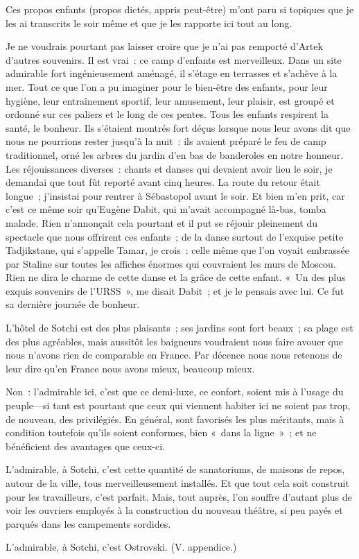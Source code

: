 \documentclass[french,twoside]{book} %
\newcommand{\astermono}{\medskip\centerline{\color{rubric}\large\selectfont{\syms ✻}}\medskip\par}%
\begin{document}
Ces propos enfants (propos dictés, appris peut-être) m’ont paru si topiques que je les ai transcrits le soir même et que je les rapporte ici tout au long.\par
Je ne voudrais pourtant pas laisser croire que je n’ai pas remporté d’Artek d’autres souvenirs. Il est vrai : ce camp d’enfants est merveilleux. Dans un site admirable fort ingénieusement aménagé, il s’étage en terrasses et s’achève à la mer. Tout ce que l’on a pu imaginer pour le bien-être des enfants, pour leur hygiène, leur entraînement sportif, leur amusement, leur plaisir, est groupé et ordonné sur ces paliers et le long de ces pentes. Tous les enfants respirent la santé, le bonheur. Ils s’étaient montrés fort déçus lorsque nous leur avons dit que nous ne pourrions rester jusqu’à la nuit : ils avaient préparé le feu de camp traditionnel, orné les arbres du jardin d’en bas de banderoles en notre honneur. Les réjouissances diverses : chants et danses qui devaient avoir lieu le soir, je demandai que tout fût reporté avant cinq heures. La route du retour était longue ; j’insistai pour rentrer à Sébastopol avant le soir. Et bien m’en prit, car c’est ce même soir qu’Eugène Dabit, qui m’avait accompagné là-bas, tomba malade. Rien n’annonçait cela pourtant et il put se réjouir pleinement du spectacle que nous offrirent ces enfants ; de la danse surtout de l’exquise petite Tadjikstane, qui s’appelle Tamar, je crois : celle même que l’on voyait embrassée par Staline sur toutes les affiches énormes qui couvraient les murs de Moscou. Rien ne dira le charme de cette danse et la grâce de cette enfant. « Un des plus exquis souvenirs de l’URSS », me disait Dabit ; et je le pensais avec lui. Ce fut sa dernière journée de bonheur.\par

\astermono

\noindent L’hôtel de Sotchi est des plus plaisants ; ses jardins sont fort beaux ; sa plage est des plus agréables, mais aussitôt les baigneurs voudraient nous faire avouer que nous n’avons rien de comparable en France. Par décence nous nous retenons de leur dire qu’en France nous avons mieux, beaucoup mieux.\par
Non : l’admirable ici, c’est que ce demi-luxe, ce confort, soient mis à l’usage du peuple—si tant est pourtant que ceux qui viennent habiter ici ne soient pas trop, de nouveau, des privilégiés. En général, sont favorisés les plus méritants, mais à condition toutefois qu’ils soient conformes, bien « dans la ligne » ; et ne bénéficient des avantages que ceux-ci.\par
L’admirable, à Sotchi, c’est cette quantité de sanatoriums, de maisons de repos, autour de la ville, tous merveilleusement installés. Et que tout cela soit construit pour les travailleurs, c’est parfait. Mais, tout auprès, l’on souffre d’autant plus de voir les ouvriers employés à la construction du nouveau théâtre, si peu payés et parqués dans les campements sordides.\par
L’admirable, à Sotchi, c’est Ostrovski. (V. appendice.)\par
\end{document}
